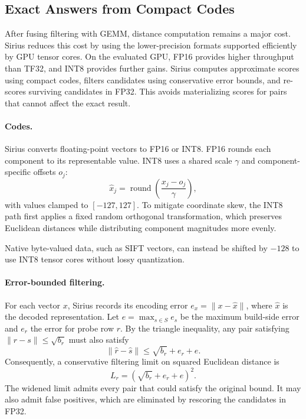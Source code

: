 

\subsection{Exact Answers from Compact Codes}\label{subsec:exact-codes}

After fusing filtering with GEMM, distance computation remains a major
cost. Sirius reduces this cost by using the lower-precision formats
supported efficiently by GPU tensor cores. On the evaluated GPU, FP16
provides higher throughput than TF32, and INT8 provides further gains.
Sirius computes approximate scores using compact codes, filters
candidates using conservative error bounds, and re-scores surviving
candidates in FP32. This avoids materializing scores for pairs that
cannot affect the exact result.

\paragraph{Codes.}
Sirius converts floating-point vectors to FP16 or INT8. FP16 rounds
each component to its representable value. INT8 uses a shared scale
$\gamma$ and component-specific offsets $o_j$:
\[
    \hat{x}_j =
    \operatorname{round}\left(\frac{x_j-o_j}{\gamma}\right),
\]
with values clamped to $[-127,127]$. To mitigate coordinate skew,
the INT8 path first applies a fixed random orthogonal transformation,
which preserves Euclidean distances while distributing component
magnitudes more evenly.

Native byte-valued data, such as SIFT vectors, can instead be shifted
by $-128$ to use INT8 tensor cores without lossy quantization.



\paragraph{Error-bounded filtering.}
For each vector $x$, Sirius records its encoding error
$e_x=\|x-\hat{x}\|$, where $\hat{x}$ is the decoded representation.
Let $e=\max_{s\in S} e_s$ be the maximum build-side error and $e_r$
the error for probe row $r$. By the triangle inequality, any pair
satisfying $\|r-s\|\leq\sqrt{b_r}$ must also satisfy
\[
    \|\hat{r}-\hat{s}\|
    \leq \sqrt{b_r}+e_r+e.
\]
Consequently, a conservative filtering limit on squared Euclidean
distance is
\[
    L_r = \left(\sqrt{b_r}+e_r+e\right)^2.
\]
The widened limit admits every pair that could satisfy the original
bound. It may also admit false positives, which are eliminated by
rescoring the candidates in FP32.

